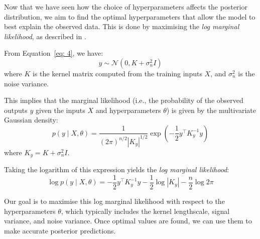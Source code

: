 \documentclass{article}
\begin{document}
Now that we have seen how the choice of hyperparameters affects the posterior distribution, we aim to find the optimal hyperparameters that allow the model to best explain the observed data. This is done by maximising the \textit{log marginal likelihood}, as described in \cite{bible}.

\bigskip
\noindent
From Equation~\ref{eq: 4}, we have:
\[
y \sim \mathcal{N}(0, K + \sigma_n^2 I)
\]
where \( K \) is the kernel matrix computed from the training inputs \( X \), and \( \sigma_n^2 \) is the noise variance.

\noindent
This implies that the marginal likelihood (i.e., the probability of the observed outputs \( y \) given the inputs \( X \) and hyperparameters \( \theta \)) is given by the multivariate Gaussian density:
\[
p(y \mid X, \theta) = \frac{1}{(2\pi)^{n/2} |K_y|^{1/2}} \exp\left( -\frac{1}{2} y^\top K_y^{-1} y \right)
\]
where \( K_y = K + \sigma_n^2 I \).

\bigskip

\noindent
Taking the logarithm of this expression yields the \textit{log marginal likelihood}:
\begin{equation}\label{eq: 5}
\log p(y \mid X, \theta) = -\frac{1}{2} y^\top K_y^{-1} y - \frac{1}{2} \log |K_y| - \frac{n}{2} \log 2\pi
\end{equation}

\noindent
Our goal is to maximise this log marginal likelihood with respect to the hyperparameters \( \theta \), which typically includes the kernel lengthscale, signal variance, and noise variance. Once optimal values are found, we can use them to make accurate posterior predictions.
\end{document}
